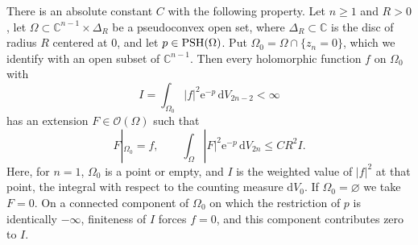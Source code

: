 \begin{theorem}\label{thm:local-ot-extension}
There is an absolute constant $C$ with the following property. Let $n\ge1$ and $R>0$, let $\Omega\subset\mathbb C^{n-1}\times\Delta_R$ be a pseudoconvex open set, where $\Delta_R\subset\mathbb C$ is the disc of radius $R$ centered at $0$, and let $p\in\mathrm{PSH}(\Omega)$. Put $\Omega_0=\Omega\cap\{z_n=0\}$, which we identify with an open subset of $\mathbb C^{n-1}$. Then every holomorphic function $f$ on $\Omega_0$ with
\[
 I=\int_{\Omega_0}|f|^2\mathrm e^{-p}\,\mathrm dV_{2n-2}<\infty
\]
has an extension $F\in\mathcal O(\Omega)$ such that
\[
 F|_{\Omega_0}=f,\qquad
 \int_\Omega|F|^2\mathrm e^{-p}\,\mathrm dV_{2n}\le C R^2 I.
\]
Here, for $n=1$, $\Omega_0$ is a point or empty, and $I$ is the weighted value of $|f|^2$ at that point, the integral with respect to the counting measure $\mathrm dV_0$. If $\Omega_0=\varnothing$ we take $F=0$. On a connected component of $\Omega_0$ on which the restriction of $p$ is identically $-\infty$, finiteness of $I$ forces $f=0$, and this component contributes zero to $I$.
\end{theorem}

